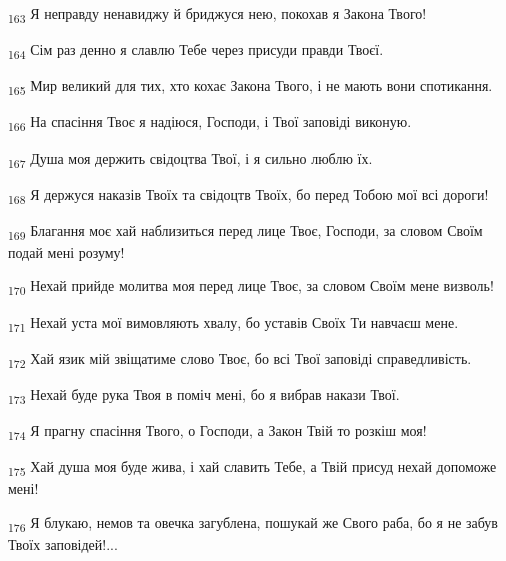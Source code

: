 \begin{tcolorbox}
\textsubscript{163} Я неправду ненавиджу й бриджуся нею, покохав я Закона Твого!
\end{tcolorbox}
\begin{tcolorbox}
\textsubscript{164} Сім раз денно я славлю Тебе через присуди правди Твоєї.
\end{tcolorbox}
\begin{tcolorbox}
\textsubscript{165} Мир великий для тих, хто кохає Закона Твого, і не мають вони спотикання.
\end{tcolorbox}
\begin{tcolorbox}
\textsubscript{166} На спасіння Твоє я надіюся, Господи, і Твої заповіді виконую.
\end{tcolorbox}
\begin{tcolorbox}
\textsubscript{167} Душа моя держить свідоцтва Твої, і я сильно люблю їх.
\end{tcolorbox}
\begin{tcolorbox}
\textsubscript{168} Я держуся наказів Твоїх та свідоцтв Твоїх, бо перед Тобою мої всі дороги!
\end{tcolorbox}
\begin{tcolorbox}
\textsubscript{169} Благання моє хай наблизиться перед лице Твоє, Господи, за словом Своїм подай мені розуму!
\end{tcolorbox}
\begin{tcolorbox}
\textsubscript{170} Нехай прийде молитва моя перед лице Твоє, за словом Своїм мене визволь!
\end{tcolorbox}
\begin{tcolorbox}
\textsubscript{171} Нехай уста мої вимовляють хвалу, бо уставів Своїх Ти навчаєш мене.
\end{tcolorbox}
\begin{tcolorbox}
\textsubscript{172} Хай язик мій звіщатиме слово Твоє, бо всі Твої заповіді справедливість.
\end{tcolorbox}
\begin{tcolorbox}
\textsubscript{173} Нехай буде рука Твоя в поміч мені, бо я вибрав накази Твої.
\end{tcolorbox}
\begin{tcolorbox}
\textsubscript{174} Я прагну спасіння Твого, о Господи, а Закон Твій то розкіш моя!
\end{tcolorbox}
\begin{tcolorbox}
\textsubscript{175} Хай душа моя буде жива, і хай славить Тебе, а Твій присуд нехай допоможе мені!
\end{tcolorbox}
\begin{tcolorbox}
\textsubscript{176} Я блукаю, немов та овечка загублена, пошукай же Свого раба, бо я не забув Твоїх заповідей!...
\end{tcolorbox}
